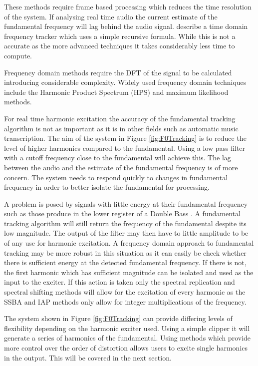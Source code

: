 		These methods require frame based processing which reduces the time resolution of the system. If analysing
		real time audio the current estimate of the fundamental frequency will lag behind the audio signal.
		\citet{larsen2004audio} describe a time domain frequency tracker which uses a simple recursive formula.
		While this is not a accurate as the more advanced techniques it takes considerably less time to compute.

		Frequency domain methods require the DFT of the signal to be calculated introducing considerable
		complexity. Widely used frequency domain techniques include the Harmonic Product Spectrum (HPS) and maximum
		likelihood methods.

		For real time harmonic excitation the accuracy of the fundamental tracking algorithm is not as important as
		it is in other fields such as automatic music transcription. The aim of the system in Figure
		\ref{fig:F0Tracking} is to reduce the level of higher harmonics compared to the fundamental. Using a low
		pass filter with a cutoff frequency close to the fundamental will achieve this. The lag between the audio
		and the estimate of the fundamental frequency is of more concern. The system needs to respond quickly to
		changes in fundamental frequency in order to better isolate the fundamental for processing.

		A problem is posed by signals with little energy at their fundamental frequency such as those produce in
		the lower register of a Double Bass \citep{askenfelt2010double}. A fundamental tracking algorithm will
		still return the frequency of the fundamental despite its low magnitude. The output of the filter may then
		have to little amplitude to be of any use for harmonic excitation. A frequency domain approach to
		fundamental tracking may be more robust in this situation as it can easily be check whether there is
		sufficient energy at the detected fundamental frequency. If there is not, the first harmonic which has
		sufficient magnitude can be isolated and used as the input to the exciter. If this action is taken only the
		spectral replication and spectral shifting methods will allow for the excitation of every harmonic as the
		SSBA and IAP methods only allow for integer multiplications of the frequency.

		The system shown in Figure \ref{fig:F0Tracking} can provide differing levels of flexibility depending on
		the harmonic exciter used. Using a simple clipper it will generate a series of harmonics of the
		fundamental. Using methods which provide more control over the order of distortion allows users to excite
		single harmonics in the output. This will be covered in the next section.

